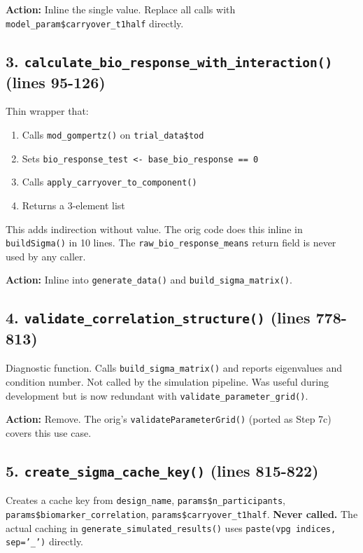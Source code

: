 \documentclass[11pt]{article}
\begin{document}
\textbf{Action:} Inline the single value. Replace all calls with
\texttt{model\_param\$carryover\_t1half} directly.

\subsection{3. \texttt{calculate\_bio\_response\_with\_interaction()} (lines 95-126)}

Thin wrapper that:

\begin{enumerate}
\item Calls \texttt{mod\_gompertz()} on \texttt{trial\_data\$tod}
\item Sets \texttt{bio\_response\_test <- base\_bio\_response == 0}
\item Calls \texttt{apply\_carryover\_to\_component()}
\item Returns a 3-element list
\end{enumerate}

This adds indirection without value. The orig code does this inline
in \texttt{buildSigma()} in 10 lines. The \texttt{raw\_bio\_response\_means} return
field is never used by any caller.

\textbf{Action:} Inline into \texttt{generate\_data()} and \texttt{build\_sigma\_matrix()}.

\subsection{4. \texttt{validate\_correlation\_structure()} (lines 778-813)}

Diagnostic function. Calls \texttt{build\_sigma\_matrix()} and reports
eigenvalues and condition number. Not called by the simulation
pipeline. Was useful during development but is now redundant with
\texttt{validate\_parameter\_grid()}.

\textbf{Action:} Remove. The orig's \texttt{validateParameterGrid()} (ported
as Step 7c) covers this use case.

\subsection{5. \texttt{create\_sigma\_cache\_key()} (lines 815-822)}

Creates a cache key from \texttt{design\_name}, \texttt{params\$n\_participants},
\texttt{params\$biomarker\_correlation}, \texttt{params\$carryover\_t1half}. \textbf{Never
called.} The actual caching in \texttt{generate\_simulated\_results()} uses
\texttt{paste(vpg indices, sep='\_')} directly.
\end{document}
